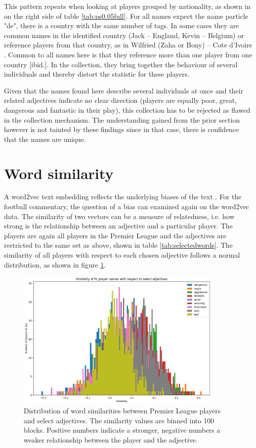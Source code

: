 \documentclass[10pt, a4paper]{UUThesisTemplate}
\begin{document}
This pattern repeats when looking at players grouped by nationality, as shown in on the right side of table \ref{tab:ps0.05full}. For all names expect the name particle "de", there is a country with the same number of tags. In some cases they are common names in the identified country (Jack – England, Kevin – Belgium) \cite{babynamegen, statbel} or reference players from that country, as in Wilfried (Zaha or Bony) – Cote d'Ivoire \cite{playerlistpl}. Common to all names here is that they reference more than one player from one country [ibid.]. In the collection, they bring together the behaviour of several individuals and thereby distort the statistic for these players.

Given that the names found here describe several individuals at once and their related adjectives indicate no clear direction (players are equally poor, great, dangerous and fantastic in their play), this collection has to be rejected as flawed in the collection mechanism. The understanding gained from the prior section however is not tainted by these findings since in that case, there is confidence that the names are unique.

\section{Word similarity}

A word2vec text embedding reflects the underlying biases of the text \cite{wordbias}. For the football commentary, the question of a bias can examined again on the word2vec data. The similarity of two vectors can be a measure of relatedness, i.e. how strong is the relationship between an adjective and a particular player. The players are again all players in the Premier League and the adjectives are restricted to the same set as above, shown in table \ref{tab:selectedwords}. The similarity of all players with respect to each chosen adjective follows a normal distribution, as shown in figure \ref{fig:simdist}.

\begin{figure}[h!b]\centering
\includegraphics[width=10cm]{figures/similarity_distribution}
\caption{Distribution of word similarities between Premier League players and select adjectives. The similarity values are binned into 100 blocks. Positive numbers indicate a stronger, negative numbers a weaker relationship between the player and the adjective.}\label{fig:simdist}
\end{figure}
\end{document}
